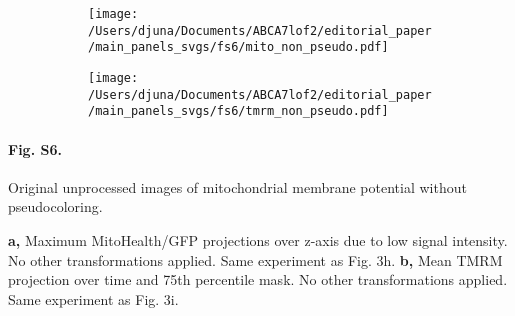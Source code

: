 % 
% 
\begin{figure}[H]
        \begin{subfigure}[t]{0.7\textwidth}
            \caption{}
            \texttt{[image: /Users/djuna/Documents/ABCA7lof2/editorial\_paper/main\_panels\_svgs/fs6/mito\_non\_pseudo.pdf]}        
        \end{subfigure}
        \begin{subfigure}[t]{0.45\textwidth}
            \caption{}
            \texttt{[image: /Users/djuna/Documents/ABCA7lof2/editorial\_paper/main\_panels\_svgs/fs6/tmrm\_non\_pseudo.pdf]}        
        \end{subfigure}
\end{figure}
\paragraph*{Fig. S6.} Original unprocessed images of mitochondrial membrane potential without pseudocoloring.
{}
\textbf{a,} Maximum MitoHealth/GFP projections over z-axis due to low signal intensity. No other transformations applied. Same experiment as Fig. 3h.
\textbf{b,} Mean TMRM projection over time and 75th percentile mask. No other transformations applied. Same experiment as Fig. 3i.

